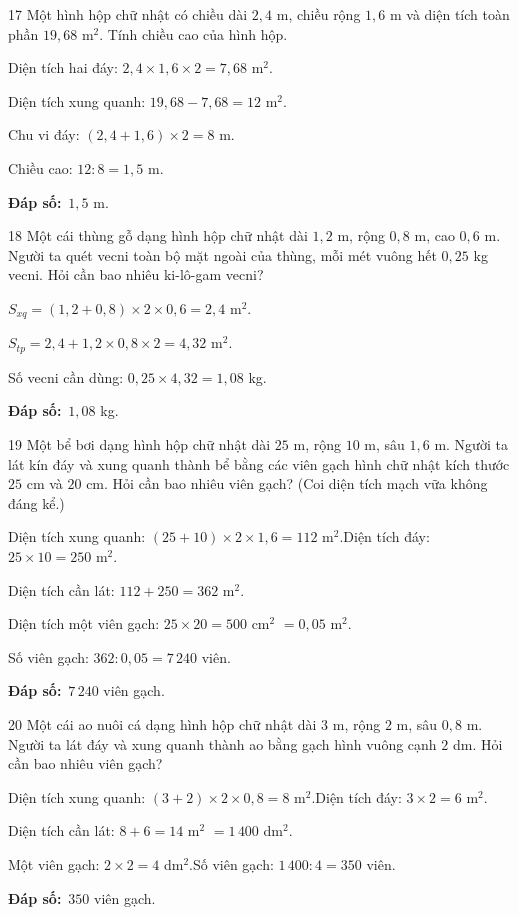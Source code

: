\documentclass[11pt]{article}
\newif\ifsol \solfalse
\providecommand{\AnsWord}{Đáp số}
\newcommand{\dapso}[1]{\par\textbf{\AnsWord:}\ #1}
\newcommand{\probsol}[1]{%
  \begin{lrbox}{\solmeasure}\begin{minipage}{\dimexpr\linewidth-24pt\relax}#1\end{minipage}\end{lrbox}%
  \ifsol
    \begin{solbox}#1\end{solbox}%
  \else
    \setlength{\solht}{\dimexpr\ht\solmeasure+\dp\solmeasure+0.85cm\relax}%
    \ifdim\solht<1.35cm\setlength{\solht}{1.35cm}\fi
    \begin{tcolorbox}[colback=white,colframe=Line,boxrule=0.8pt,arc=5pt,
      left=8pt,right=8pt,top=4pt,bottom=4pt,height=\solht]{\footnotesize\color{Slate}\itshape\WorkWord}\end{tcolorbox}%
  \fi}
\newcommand{\gap}{\vspace{0.3cm}}
\def\WorkWord{Bài làm:}
\def\AnsWord{Đáp số}
\begin{document}
\gap
\begin{probbox}{17}{\relax}
Một hình hộp chữ nhật có chiều dài $2{,}4$ m, chiều rộng $1{,}6$ m và diện tích toàn phần $19{,}68$ m$^2$. Tính chiều cao của hình hộp.
\end{probbox}
\probsol{
Diện tích hai đáy: $2{,}4\times1{,}6\times2=7{,}68$ m$^2$.\par
Diện tích xung quanh: $19{,}68-7{,}68=12$ m$^2$.\par
Chu vi đáy: $(2{,}4+1{,}6)\times2=8$ m.\par
Chiều cao: $12:8=1{,}5$ m.
\dapso{$1{,}5$ m.}}
\gap
\begin{probbox}{18}{\relax}
Một cái thùng gỗ dạng hình hộp chữ nhật dài $1{,}2$ m, rộng $0{,}8$ m, cao $0{,}6$ m. Người ta quét vecni toàn bộ mặt ngoài của thùng, mỗi mét vuông hết $0{,}25$ kg vecni. Hỏi cần bao nhiêu ki-lô-gam vecni?
\end{probbox}
\probsol{
$S_{xq}=(1{,}2+0{,}8)\times2\times0{,}6=2{,}4$ m$^2$.\par
$S_{tp}=2{,}4+1{,}2\times0{,}8\times2=4{,}32$ m$^2$.\par
Số vecni cần dùng: $0{,}25\times4{,}32=1{,}08$ kg.
\dapso{$1{,}08$ kg.}}
\gap
\begin{probbox}{19}{\relax}
Một bể bơi dạng hình hộp chữ nhật dài $25$ m, rộng $10$ m, sâu $1{,}6$ m. Người ta lát kín đáy và xung quanh thành bể bằng các viên gạch hình chữ nhật kích thước $25$ cm và $20$ cm. Hỏi cần bao nhiêu viên gạch? (Coi diện tích mạch vữa không đáng kể.)
\end{probbox}
\probsol{
Diện tích xung quanh: $(25+10)\times2\times1{,}6=112$ m$^2$.\quad Diện tích đáy: $25\times10=250$ m$^2$.\par
Diện tích cần lát: $112+250=362$ m$^2$.\par
Diện tích một viên gạch: $25\times20=500$ cm$^2$ $=0{,}05$ m$^2$.\par
Số viên gạch: $362:0{,}05=7\,240$ viên.
\dapso{$7\,240$ viên gạch.}}
\gap
\begin{probbox}{20}{\relax}
Một cái ao nuôi cá dạng hình hộp chữ nhật dài $3$ m, rộng $2$ m, sâu $0{,}8$ m. Người ta lát đáy và xung quanh thành ao bằng gạch hình vuông cạnh $2$ dm. Hỏi cần bao nhiêu viên gạch?
\end{probbox}
\probsol{
Diện tích xung quanh: $(3+2)\times2\times0{,}8=8$ m$^2$.\quad Diện tích đáy: $3\times2=6$ m$^2$.\par
Diện tích cần lát: $8+6=14$ m$^2$ $=1\,400$ dm$^2$.\par
Một viên gạch: $2\times2=4$ dm$^2$.\quad Số viên gạch: $1\,400:4=350$ viên.
\dapso{$350$ viên gạch.}}
\end{document}
